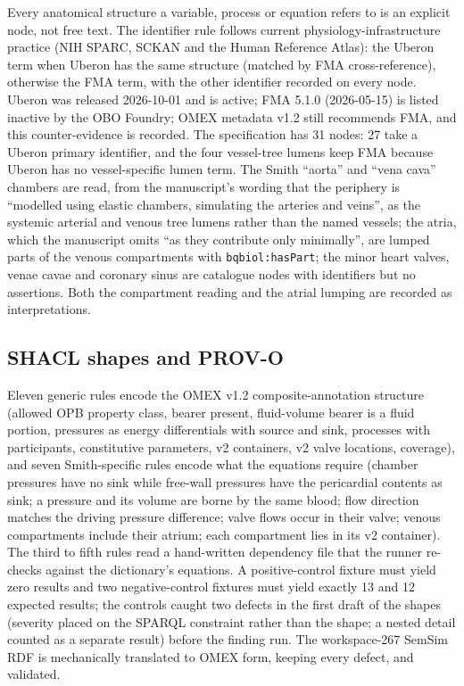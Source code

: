 \documentclass[11pt,letterpaper]{article}
\newcommand{\pkg}[1]{\texttt{#1}}
\begin{document}
Every anatomical structure a variable, process or equation refers to is an explicit node, not free text. The identifier rule follows current physiology-infrastructure practice (NIH SPARC, SCKAN and the Human Reference Atlas): the Uberon term when Uberon has the same structure (matched by FMA cross-reference), otherwise the FMA term, with the other identifier recorded on every node. Uberon was released 2026-10-01 and is active; FMA 5.1.0 (2026-05-15) is listed inactive by the OBO Foundry; OMEX metadata v1.2 still recommends FMA, and this counter-evidence is recorded. The specification has 31 nodes: 27 take a Uberon primary identifier, and the four vessel-tree lumens keep FMA because Uberon has no vessel-specific lumen term. The Smith ``aorta'' and ``vena cava'' chambers are read, from the manuscript's wording that the periphery is ``modelled using elastic chambers, simulating the arteries and veins'', as the systemic arterial and venous tree lumens rather than the named vessels; the atria, which the manuscript omits ``as they contribute only minimally'', are lumped parts of the venous compartments with \pkg{bqbiol:hasPart}; the minor heart valves, venae cavae and coronary sinus are catalogue nodes with identifiers but no assertions. Both the compartment reading and the atrial lumping are recorded as interpretations.

\subsection{SHACL shapes and PROV-O}

Eleven generic rules encode the OMEX v1.2 composite-annotation structure (allowed OPB property class, bearer present, fluid-volume bearer is a fluid portion, pressures as energy differentials with source and sink, processes with participants, constitutive parameters, v2 containers, v2 valve locations, coverage), and seven Smith-specific rules encode what the equations require (chamber pressures have no sink while free-wall pressures have the pericardial contents as sink; a pressure and its volume are borne by the same blood; flow direction matches the driving pressure difference; valve flows occur in their valve; venous compartments include their atrium; each compartment lies in its v2 container). The third to fifth rules read a hand-written dependency file that the runner re-checks against the dictionary's equations. A positive-control fixture must yield zero results and two negative-control fixtures must yield exactly 13 and 12 expected results; the controls caught two defects in the first draft of the shapes (severity placed on the SPARQL constraint rather than the shape; a nested detail counted as a separate result) before the finding run. The workspace-267 SemSim RDF is mechanically translated to OMEX form, keeping every defect, and validated.
\end{document}
